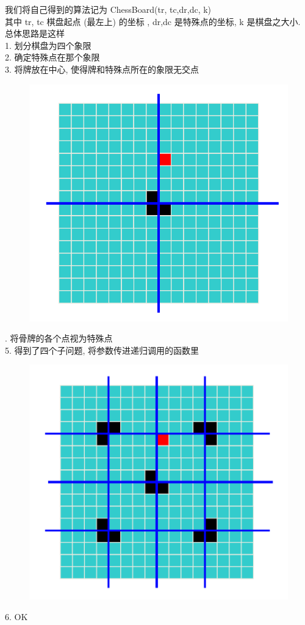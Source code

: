 \documentclass[a4paper, 10pt]{ctexart} %
\begin{document}
我们将自己得到的算法记为 {\sffamily ChessBoard(tr, tc,dr,dc, k)}\\
其中 {\sffamily tr, tc} 棋盘起点 (最左上) 的坐标 , {\sffamily dr,dc} 是特殊点的坐标,
{\sffamily k} 是棋盘之大小. \\
总体思路是这样\\
1. 划分棋盘为四个象限\\
2. 确定特殊点在那个象限\\
3. 将牌放在中心, 使得牌和特殊点所在的象限无交点\\
\begin{figure}[H]
    \centering
    \includegraphics[scale = 0.3]{7.png}\caption{}
\end{figure}
. 将骨牌的各个点视为特殊点\\
5. 得到了四个子问题, 将参数传进递归调用的函数里\\
\begin{figure}[H]
    \centering
    \includegraphics*[scale = 0.3]{8.png}\caption{}
\end{figure}
6. OK
\end{document}
